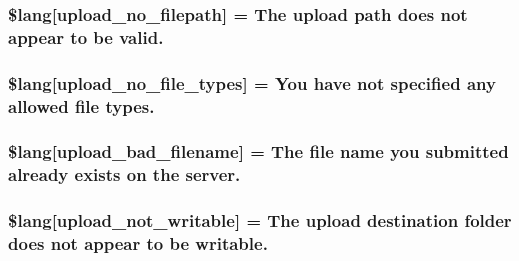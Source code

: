 \subsubsection[{\$lang}]{\setlength{\rightskip}{0pt plus 5cm}\$lang\mbox{[}\textquotesingle{}upload\+\_\+no\+\_\+filepath\textquotesingle{}\mbox{]} = \textquotesingle{}The upload path does not appear to be valid.\textquotesingle{}}\label{upload__lang_8php_a3c17908c53072c6a5ef593760aaaa704}
\hypertarget{upload__lang_8php_ab188c98e583c81905dedaad54ad452bb}{}
\subsubsection[{\$lang}]{\setlength{\rightskip}{0pt plus 5cm}\$lang\mbox{[}\textquotesingle{}upload\+\_\+no\+\_\+file\+\_\+types\textquotesingle{}\mbox{]} = \textquotesingle{}You have not specified any allowed file types.\textquotesingle{}}\label{upload__lang_8php_ab188c98e583c81905dedaad54ad452bb}
\hypertarget{upload__lang_8php_abb379322384f3f35952a539c63e2c8f7}{}
\subsubsection[{\$lang}]{\setlength{\rightskip}{0pt plus 5cm}\$lang\mbox{[}\textquotesingle{}upload\+\_\+bad\+\_\+filename\textquotesingle{}\mbox{]} = \textquotesingle{}The file name you submitted already exists on the server.\textquotesingle{}}\label{upload__lang_8php_abb379322384f3f35952a539c63e2c8f7}
\hypertarget{upload__lang_8php_aed6bfb5a9094179427f61fcbb582145b}{}
\subsubsection[{\$lang}]{\setlength{\rightskip}{0pt plus 5cm}\$lang\mbox{[}\textquotesingle{}upload\+\_\+not\+\_\+writable\textquotesingle{}\mbox{]} = \textquotesingle{}The upload destination folder does not appear to be writable.\textquotesingle{}}\label{upload__lang_8php_aed6bfb5a9094179427f61fcbb582145b}
